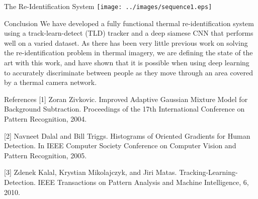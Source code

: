 \documentclass[final]{beamer}
\begin{document}
\begin{frame}{}
\begin{columns}[t]
\begin{column}{.5\linewidth}
\begin{block}{The Re-Identification System}
       \centering
 		\texttt{[image: ../images/sequence1.eps]}  
        \end{block}
        
       	\begin{block}{Conclusion}
		We have developed a fully functional thermal re-identification system using a track-learn-detect (TLD) tracker and a deep siamese CNN that performs well on a varied dataset. As there has been very little previous work on solving the re-identification problem in thermal imagery, we are defining the state of the art with this work, and have shown that it is possible when using deep learning to accurately discriminate between people as they move through an area covered by a thermal camera network.
        
        \end{block}
        
        \begin{block}{References}
		\scriptsize
[1] Zoran Zivkovic. Improved Adaptive Gaussian Mixture Model for Background Subtraction. Proceedings of the 17th International Conference on Pattern Recognition, 2004.
    
[2] Navneet Dalal and Bill Triggs. Histograms of Oriented Gradients for Human Detection. In IEEE Computer Society Conference on Computer Vision and Pattern Recognition, 2005.

[3] Zdenek Kalal, Krystian Mikolajczyk, and Jiri Matas. Tracking-Learning-Detection. IEEE Transactions on Pattern Analysis and Machine Intelligence, 6, 2010.
		
    \end{block}

      \end{column}
    \end{columns}
     

  \end{frame}
\end{document}
